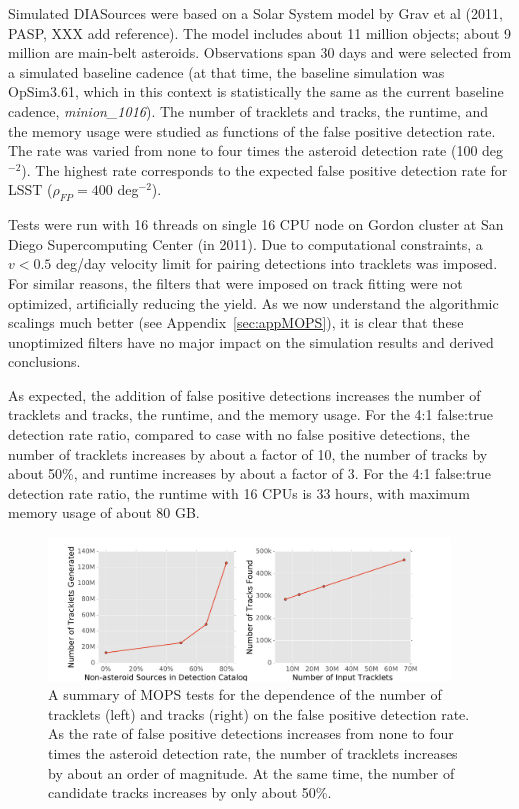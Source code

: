 Simulated DIASources were based on a Solar System model by Grav et al (2011, PASP, XXX add reference).
The model includes about 11 million objects; about 9 million are main-belt asteroids. Observations span
30 days and were selected from a simulated baseline cadence (at that time, the baseline simulation was
OpSim3.61, which in this context is statistically the same as the current baseline cadence, {\it minion\_1016}).
The number of tracklets and tracks, the runtime, and the memory usage were studied as functions of
the false positive detection rate. The rate was varied from none to four times the asteroid detection rate
(100 deg$^{-2}$).  The highest rate corresponds to the expected false positive detection rate for LSST
($\rho_{FP} =  400$ deg$^{-2}$).

Tests were run with 16 threads on single 16 CPU node on Gordon cluster at San Diego Supercomputing
Center (in 2011). Due to computational constraints, a $v < 0.5$ deg/day velocity limit for pairing detections
into tracklets was imposed. For similar reasons, the filters that were imposed on track fitting were not
optimized, artificially reducing the yield. As we now understand the algorithmic scalings much better
(see Appendix~\ref{sec:appMOPS}), it is clear that these unoptimized filters have no major impact on the
simulation results and derived conclusions.

As expected, the addition of false positive detections increases the number of tracklets and tracks,
the runtime, and the memory usage. For the 4:1 false:true detection rate ratio, compared to case with
no false positive detections, the number of tracklets increases by about
a factor of 10, the number of tracks by about 50\%, and runtime increases by about a factor of 3.
For the 4:1 false:true detection rate ratio, the runtime with 16 CPUs is 33 hours, with maximum memory
usage of about 80 GB.




\begin{figure}[t!]
\centering
\vskip -0.3in
\includegraphics[width=0.95\textwidth]{figures/track_stats}
\caption{A summary of MOPS tests for the dependence of the number of tracklets (left)
and tracks (right) on the false positive detection rate. As the rate of false positive detections
increases from none to four times the asteroid detection rate, the number of tracklets
increases by about an order of magnitude. At the same time, the number of candidate
tracks increases by only about 50\%.
\label{fig:MOPStests}}
\end{figure}




